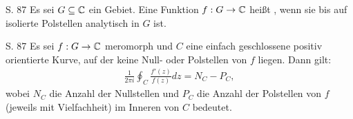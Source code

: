\begin{definition}{S. 87}
  \label{def:8_2}
  Es sei $G \subseteq \mathbb{C}$ ein Gebiet.
  Eine Funktion $f : G \to \mathbb{C}$ heißt , wenn sie bis auf isolierte Polstellen analytisch in $G$ ist.
\end{definition}

\begin{satz}{S. 87}
  \label{satz:8_3}
  Es sei $f : G \to \mathbb{C}$ meromorph und $C$ eine einfach geschlossene positiv orientierte Kurve, auf der keine Null- oder Polstellen von $f$ liegen.
  Dann gilt:
  \begin{align}
    \frac{1}{2 \pi i} \oint_C \frac{f'(z)}{f(z)} dz = N_C - P_C ,
  \end{align}
  wobei $N_C$ die Anzahl der Nullstellen und $P_C$ die Anzahl der Polstellen von $f$ (jeweils mit Vielfachheit) im Inneren von $C$ bedeutet.
\end{satz}
